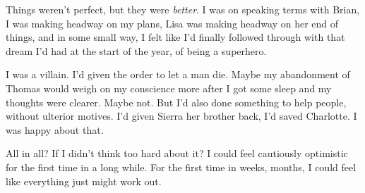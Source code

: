 Things weren't perfect, but they were \emph{better}.  I was on speaking terms with Brian, I was making headway on my plans, Lisa was making headway on her end of things, and in some small way, I felt like I'd finally followed through with that dream I'd had at the start of the year, of being a superhero.



I was a villain.  I'd given the order to let a man die.   Maybe my abandonment of Thomas would weigh on my conscience more after I got some sleep and my thoughts were clearer.  Maybe not.  But I'd also done something to help people, without ulterior motives.   I'd given Sierra her brother back, I'd saved Charlotte.  I was happy about that.



All in all?  If I didn't think too hard about it?  I could feel cautiously optimistic for the first time in a long while.  For the first time in weeks, months, I could feel like everything just might work out.





